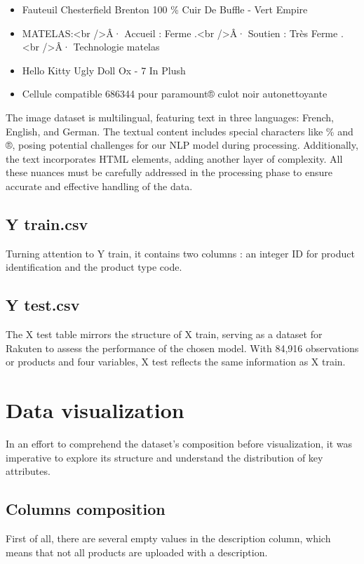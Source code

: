 \begin{itemize}
	\item Fauteuil Chesterfield Brenton 100 \% Cuir De Buffle - Vert Empire\\
	\item MATELAS:<br />Â· Accueil : Ferme .<br />Â· Soutien : Très Ferme .<br />Â· Technologie matelas\\
	\item Hello Kitty Ugly Doll Ox - 7 In Plush\\
	\item Cellule compatible 686344 pour paramount® culot noir autonettoyante\\ 
\end{itemize}

The image dataset is multilingual, featuring text in three languages: French, English, and German. The textual content includes special characters like \%  and ®, posing potential challenges for our NLP model during processing. Additionally, the text incorporates HTML elements, adding another layer of complexity. All these nuances must be carefully addressed in the processing phase to ensure accurate and effective handling of the data.
\subsection{Y train.csv}
Turning attention to Y train, it contains two columns : an integer ID for product identification and the product type code.

\subsection{Y test.csv}
The X test table mirrors the structure of X train, serving as a dataset for Rakuten to assess the performance of the chosen model. With 84,916 observations or products and four variables, X test reflects the same information as X train.

\newpage

\section{Data visualization}
In an effort to comprehend the dataset's composition before visualization, it was imperative to explore its structure and understand the distribution of key attributes.\\

\subsection{Columns composition}
First of all, there are several empty values in the description column, which means that not all products are uploaded with a description. \\


